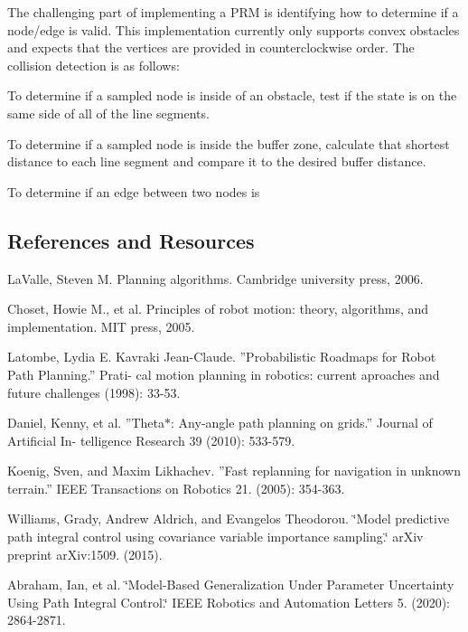 The challenging part of implementing a P\+RM is identifying how to determine if a node/edge is valid. This implementation currently only supports convex obstacles and expects that the vertices are provided in counterclockwise order. The collision detection is as follows\+:
\begin{DoxyItemize}
\item To determine if a sampled node is inside of an obstacle, test if the state is on the same side of all of the line segments.
\item To determine if a sampled node is inside the buffer zone, calculate that shortest distance to each line segment and compare it to the desired buffer distance.
\item To determine if an edge between two nodes is
\end{DoxyItemize}

\subsection*{References and Resources}


\begin{DoxyItemize}
\item La\+Valle, Steven M. Planning algorithms. Cambridge university press, 2006.
\item Choset, Howie M., et al. Principles of robot motion\+: theory, algorithms, and implementation. M\+IT press, 2005.
\item Latombe, Lydia E. Kavraki Jean-\/\+Claude. ”\+Probabilistic Roadmaps for Robot Path Planning.\+” Prati-\/ cal motion planning in robotics\+: current aproaches and future challenges (1998)\+: 33-\/53.
\item Daniel, Kenny, et al. ”\+Theta$\ast$\+: Any-\/angle path planning on grids.\+” Journal of Artificial In-\/ telligence Research 39 (2010)\+: 533-\/579.
\item Koenig, Sven, and Maxim Likhachev. ”\+Fast replanning for navigation in unknown terrain.\+” I\+E\+EE Transactions on Robotics 21. (2005)\+: 354-\/363.
\item Williams, Grady, Andrew Aldrich, and Evangelos Theodorou. \char`\"{}\+Model predictive path integral control using covariance variable importance sampling.\char`\"{} ar\+Xiv preprint ar\+Xiv\+:1509. (2015).
\item Abraham, Ian, et al. \char`\"{}\+Model-\/\+Based Generalization Under Parameter Uncertainty Using Path Integral Control.\char`\"{} I\+E\+EE Robotics and Automation Letters 5. (2020)\+: 2864-\/2871. 
\end{DoxyItemize}